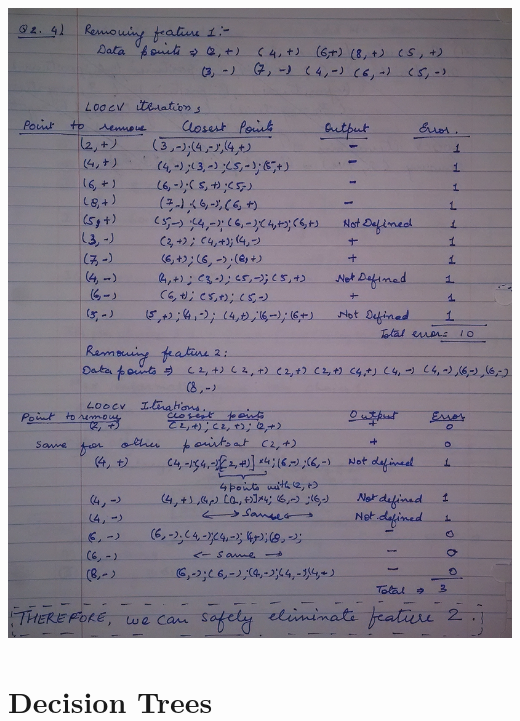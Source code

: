 \documentclass[letterpaper]{article}
\begin{document}
\begin{center}
\includegraphics[width = 6in]{12.png}
\end{center}

\section{Decision Trees}
\end{document}

